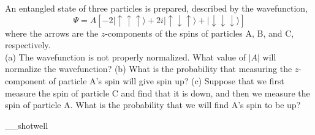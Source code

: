 An entangled state of three particles is prepared, described by the 
wavefunction,
\begin{equation*}
  \Psi = A\left[
     -2|\uparrow\uparrow\uparrow\rangle 
    +2i|\uparrow\downarrow\uparrow\rangle 
    +|\downarrow\downarrow\downarrow\rangle
  \right]
\end{equation*}
where the arrows are the $z$-components of the spins of particles A, B, and C, respectively.\\
%
(a) The wavefunction is not properly normalized.
What value of $|A|$ will normalize the wavefunction?\answercheck\hwendpart
%
(b) What is the probability that measuring the $z$-component of 
particle A's spin will give spin up?\answercheck\hwendpart
%
(c) Suppose that we first measure the spin of particle C and find that it is down,
and then we measure the spin of particle A. What is the probability that we will
find A's spin to be up?\answercheck\hwendpart

__shotwell
